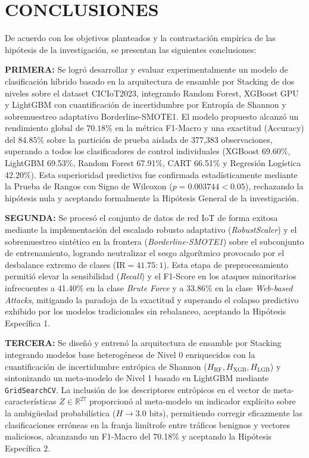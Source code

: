 \chapter{CONCLUSIONES}

De acuerdo con los objetivos planteados y la contrastación empírica de las hipótesis de la investigación, se presentan las siguientes conclusiones:

\noindent \textbf{PRIMERA:} Se logró desarrollar y evaluar experimentalmente un modelo de clasificación híbrido basado en la arquitectura de ensamble por Stacking de dos niveles sobre el dataset CICIoT2023, integrando Random Forest, XGBoost GPU y LightGBM con cuantificación de incertidumbre por Entropía de Shannon y sobremuestreo adaptativo Borderline-SMOTE1. El modelo propuesto alcanzó un rendimiento global de $70.18\%$ en la métrica F1-Macro y una exactitud (Accuracy) del $84.85\%$ sobre la partición de prueba aislada de 377,383 observaciones, superando a todos los clasificadores de control individuales (XGBoost 69.60\%, LightGBM 69.53\%, Random Forest 67.91\%, CART 66.51\% y Regresión Logística 42.20\%). Esta superioridad predictiva fue confirmada estadísticamente mediante la Prueba de Rangos con Signo de Wilcoxon ($p = 0.003744 < 0.05$), rechazando la hipótesis nula y aceptando formalmente la Hipótesis General de la investigación.

\vspace{0.8em}
\noindent \textbf{SEGUNDA:} Se procesó el conjunto de datos de red IoT de forma exitosa mediante la implementación del escalado robusto adaptativo (\textit{RobustScaler}) y el sobremuestreo sintético en la frontera (\textit{Borderline-SMOTE1}) sobre el subconjunto de entrenamiento, logrando neutralizar el sesgo algorítmico provocado por el desbalance extremo de clases ($\mathrm{IR} = 41.75:1$). Esta etapa de preprocesamiento permitió elevar la sensibilidad (\textit{Recall}) y el F1-Score en los ataques minoritarios infrecuentes a 41.40\% en la clase \textit{Brute Force} y a 33.86\% en la clase \textit{Web-based Attacks}, mitigando la paradoja de la exactitud y superando el colapso predictivo exhibido por los modelos tradicionales sin rebalanceo, aceptando la Hipótesis Específica 1.

\vspace{0.8em}
\noindent \textbf{TERCERA:} Se diseñó y entrenó la arquitectura de ensamble por Stacking integrando modelos base heterogéneos de Nivel 0 enriquecidos con la cuantificación de incertidumbre entrópica de Shannon ($H_{\mathrm{RF}}, H_{\mathrm{XGB}}, H_{\mathrm{LGB}}$) y sintonizando un meta-modelo de Nivel 1 basado en LightGBM mediante \texttt{GridSearchCV}. La inclusión de los descriptores entrópicos en el vector de meta-características $Z \in \mathbb{R}^{27}$ proporcionó al meta-modelo un indicador explícito sobre la ambigüedad probabilística ($H \to 3.0\text{ bits}$), permitiendo corregir eficazmente las clasificaciones erróneas en la franja limítrofe entre tráficos benignos y vectores maliciosos, alcanzando un F1-Macro del 70.18\% y aceptando la Hipótesis Específica 2.

